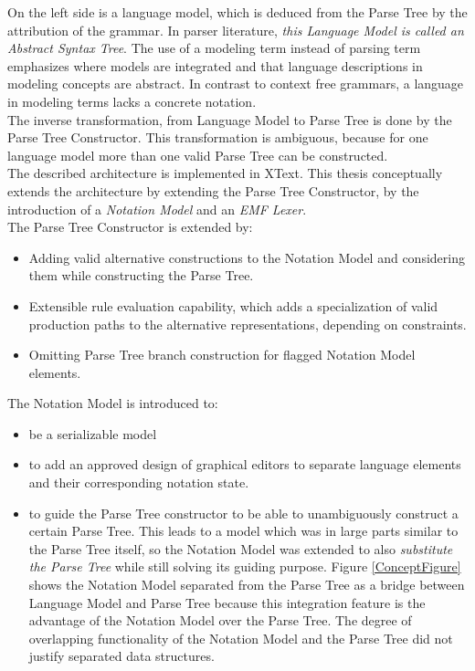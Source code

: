 On the left side is a language model, which is deduced from the Parse Tree by the attribution of the grammar. In parser literature, \emph{this Language Model is called an Abstract Syntax Tree}. The use of a modeling term instead of parsing term emphasizes where models are integrated and that language descriptions in modeling concepts are abstract. In contrast to context free grammars, a language in modeling terms lacks a concrete notation. \\
The inverse transformation, from Language Model to Parse Tree is done by the Parse Tree Constructor. This transformation is ambiguous, because for one language model more than one valid Parse Tree can be constructed. \\
The described architecture is implemented in XText. This thesis conceptually extends the architecture by extending the Parse Tree Constructor, by the introduction of a \emph{Notation Model} and an \emph{EMF Lexer}.\\
The Parse Tree Constructor is extended by:
\begin{itemize}
	\item Adding valid alternative constructions to the Notation Model and considering them while constructing the Parse Tree. 
	\item Extensible rule evaluation capability, which adds a specialization of valid production paths to the alternative representations, depending on constraints. 
	\item Omitting Parse Tree branch construction for flagged Notation Model elements.
\end{itemize}
The Notation Model is introduced to:
\begin{itemize}
	\item be a serializable model
	\item to add an approved design of graphical editors to separate language elements and their corresponding notation state.
	\item to guide the Parse Tree constructor to be able to unambiguously construct a certain Parse Tree. This leads to a model which was in large parts similar to the Parse Tree itself, so the Notation Model was extended to also \emph{substitute the Parse Tree} while still solving its guiding purpose. Figure \ref{ConceptFigure} shows the Notation Model separated from the Parse Tree as a bridge between Language Model and Parse Tree because this integration feature is the advantage of the Notation Model over the Parse Tree. The degree of overlapping functionality of the Notation Model and the Parse Tree did not justify separated data structures.
\end{itemize} 
